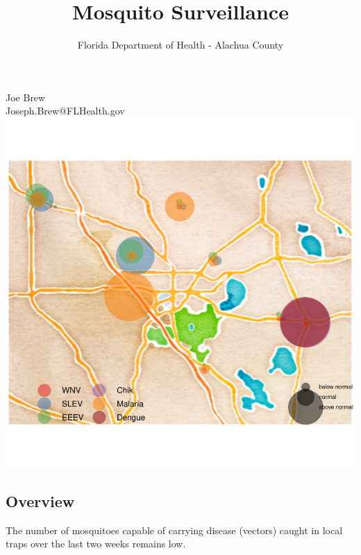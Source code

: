\documentclass{article}
\title{Mosquito Surveillance}
\author{Florida Department of Health - Alachua County}
\begin{document}

\maketitle
\begin{center}
Joe Brew\\
Joseph.Brew@FLHealth.gov\\

\includegraphics{mosq28oct13-002}
\end{center}
\newpage
\tableofcontents




\begin{center}
\section*{Overview}

\end{center}
The number of mosquitoes capable of carrying disease (vectors) caught in local traps over the last two weeks remains low.
\end{document}
